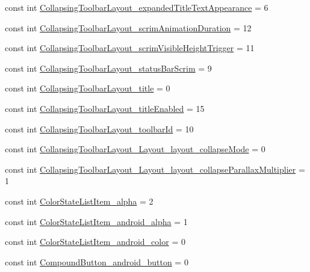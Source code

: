 \begin{CompactItemize}
\item 
const int \hyperlink{class__2doo_1_1_droid_1_1_resource_1_1_styleable_8e9970c178938ef76bc0e1af878dae52}{CollapsingToolbarLayout\_\-expandedTitleTextAppearance} = 6
\item 
const int \hyperlink{class__2doo_1_1_droid_1_1_resource_1_1_styleable_8927384c05eeb6c22d382814a9d873b6}{CollapsingToolbarLayout\_\-scrimAnimationDuration} = 12
\item 
const int \hyperlink{class__2doo_1_1_droid_1_1_resource_1_1_styleable_1ba55abc6cd3347ea0c4bb80d6e2ed29}{CollapsingToolbarLayout\_\-scrimVisibleHeightTrigger} = 11
\item 
const int \hyperlink{class__2doo_1_1_droid_1_1_resource_1_1_styleable_725173ecebfbbd3eca6291aa460e05aa}{CollapsingToolbarLayout\_\-statusBarScrim} = 9
\item 
const int \hyperlink{class__2doo_1_1_droid_1_1_resource_1_1_styleable_3dab00a353fe79b7842af7dd4df266c7}{CollapsingToolbarLayout\_\-title} = 0
\item 
const int \hyperlink{class__2doo_1_1_droid_1_1_resource_1_1_styleable_eb2ed7978e6461220e8225e2134ccca0}{CollapsingToolbarLayout\_\-titleEnabled} = 15
\item 
const int \hyperlink{class__2doo_1_1_droid_1_1_resource_1_1_styleable_2519457bac2334709a7a472def1d720f}{CollapsingToolbarLayout\_\-toolbarId} = 10
\item 
const int \hyperlink{class__2doo_1_1_droid_1_1_resource_1_1_styleable_15170e5fe07dc6fae92bcc35ced0f052}{CollapsingToolbarLayout\_\-Layout\_\-layout\_\-collapseMode} = 0
\item 
const int \hyperlink{class__2doo_1_1_droid_1_1_resource_1_1_styleable_2c41ce0dc169d30ee5aa4f6d1a8bd9f6}{CollapsingToolbarLayout\_\-Layout\_\-layout\_\-collapseParallaxMultiplier} = 1
\item 
const int \hyperlink{class__2doo_1_1_droid_1_1_resource_1_1_styleable_fbd3f6e8d5b1664d77e0728ba0d37822}{ColorStateListItem\_\-alpha} = 2
\item 
const int \hyperlink{class__2doo_1_1_droid_1_1_resource_1_1_styleable_91c980a45c030ac379b12da77d2bed00}{ColorStateListItem\_\-android\_\-alpha} = 1
\item 
const int \hyperlink{class__2doo_1_1_droid_1_1_resource_1_1_styleable_63cc216593bfffbcf7a45f1c678c152e}{ColorStateListItem\_\-android\_\-color} = 0
\item 
const int \hyperlink{class__2doo_1_1_droid_1_1_resource_1_1_styleable_f9d9bb3b689aca82caa5609d5e6225e0}{CompoundButton\_\-android\_\-button} = 0

\end{CompactItemize}
